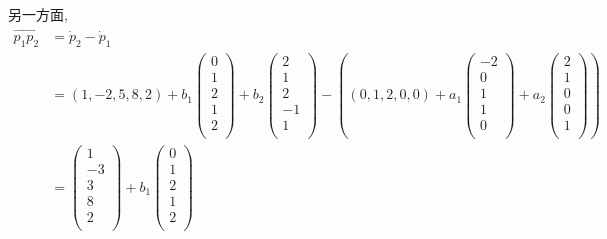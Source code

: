 \documentclass{ctexart}
\begin{document}
\begin{solution}
    另一方面,
    \begin{align*}
        \overrightarrow{p_1p_2} & =\dot{p}_2-\dot{p}_1 \\
        & =(1,-2,5,8,2)+b_1\begin{pmatrix}
            0 \\
            1 \\
            2 \\
            1 \\
            2 \\
        \end{pmatrix}+b_2\begin{pmatrix}
            2 \\
            1 \\
            2 \\
            -1 \\
            1 \\
        \end{pmatrix}-((0,1,2,0,0)+a_1\begin{pmatrix}
            -2 \\
            0 \\
            1 \\
            1 \\
            0 \\
        \end{pmatrix}+a_2\begin{pmatrix}
            2 \\
            1 \\
            0 \\
            0 \\
            1 \\
        \end{pmatrix}) \\
        & =\begin{pmatrix}
            1 \\
            -3 \\
            3 \\
            8 \\
            2 \\
        \end{pmatrix}+b_1\begin{pmatrix}
            0 \\
            1 \\
            2 \\
            1 \\
            2 \\

\end{pmatrix}
\end{align*}
\end{solution}
\end{document}
